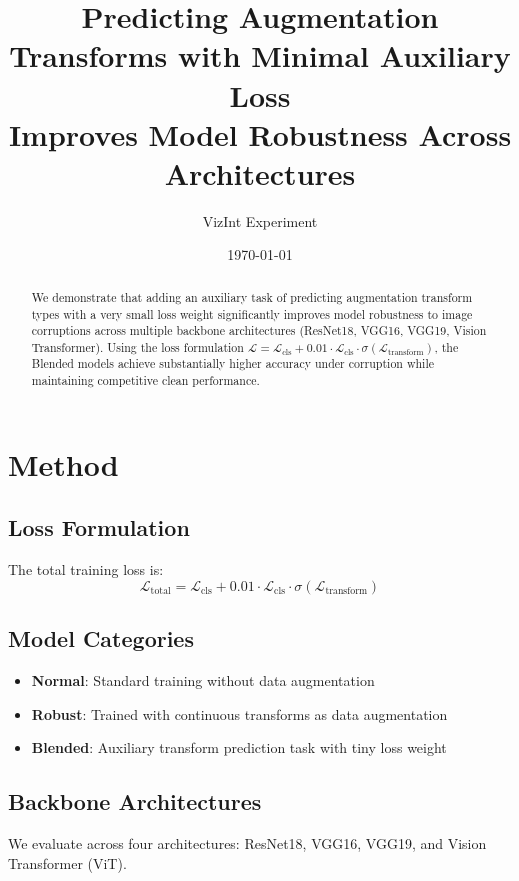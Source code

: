 \documentclass[11pt,a4paper]{article}
\title{Predicting Augmentation Transforms with Minimal Auxiliary Loss \\ Improves Model Robustness Across Architectures}
\author{VizInt Experiment}
\date{\today}
\begin{document}
\maketitle

\begin{abstract}
We demonstrate that adding an auxiliary task of predicting augmentation transform types with a very small loss weight significantly improves model robustness to image corruptions across multiple backbone architectures (ResNet18, VGG16, VGG19, Vision Transformer). Using the loss formulation $\mathcal{L} = \mathcal{L}_{\text{cls}} + 0.01 \cdot \mathcal{L}_{\text{cls}} \cdot \sigma(\mathcal{L}_{\text{transform}})$, the Blended models achieve substantially higher accuracy under corruption while maintaining competitive clean performance.
\end{abstract}

\section{Method}
\subsection{Loss Formulation}
The total training loss is:
\begin{equation}
\mathcal{L}_{\text{total}} = \mathcal{L}_{\text{cls}} + 0.01 \cdot \mathcal{L}_{\text{cls}} \cdot \sigma(\mathcal{L}_{\text{transform}})
\end{equation}

\subsection{Model Categories}
\begin{itemize}
\item \textbf{Normal}: Standard training without data augmentation
\item \textbf{Robust}: Trained with continuous transforms as data augmentation
\item \textbf{Blended}: Auxiliary transform prediction task with tiny loss weight
\end{itemize}

\subsection{Backbone Architectures}
We evaluate across four architectures: ResNet18, VGG16, VGG19, and Vision Transformer (ViT).
\end{document}
